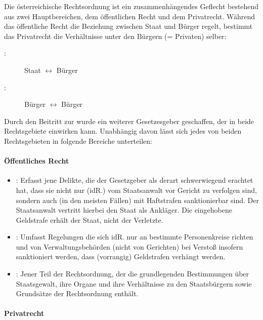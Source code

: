 Die \"osterreichische Rechtsordnung ist ein zusammenhängendes Geflecht
bestehend aus zwei Hauptbereichen, dem \"offentlichen Recht und dem
Privatrecht. Während das \"offentliche Recht die Beziehung zwischen
Staat und B\"urger regelt, bestimmt das Privatrecht die Verhältnisse
unter den B\"urgern (= Privaten) selber: 

\begin{description}
	\item[:] Staat ${\leftrightarrow}$ B\"urger
	\item[:] B\"urger ${\leftrightarrow}$ B\"urger
\end{description}

Durch den Beitritt zur  wurde ein weiterer Gesetzesgeber geschaffen,
der in beide Rechtsgebiete einwirken kann. Unabhängig davon lässt
sich jedes von beiden Rechts\-ge\-bieten in folgende
Bereiche unterteilen:

\paragraph*{\"Offentliches Recht}

\begin{itemize}
	\item {}: Erfasst jene Delikte, die der Gesetzgeber als derart schwerwiegend erachtet hat, dass sie nicht nur (idR.) vom Staatsanwalt vor Gericht zu verfolgen sind,  sondern auch (in den meisten Fällen) mit Haftstrafen sanktionierbar sind. Der Staatsanwalt vertritt hierbei den Staat als Ankläger. Die eingehobene Geldstrafe erhält der Staat, nicht der Verletzte.

	\item {}: Umfasst Regelungen die sich idR. nur an bestimmte Personenkreise richten und von Verwaltungsbeh\"orden
(nicht von Gerichten) bei Versto{\ss} insofern sanktioniert werden, dass (vorrangig) Geldstrafen verhängt werden.

	\item {}: Jener Teil der Rechtsordnung, der die grundlegenden Bestimmungen \"uber Staatsgewalt, ihre Organe und
ihre Verhältnisse zu den Staatsb\"urgern sowie Grundsätze der Rechtsordnung enthält.

\end{itemize}

\paragraph*{Privatrecht}


